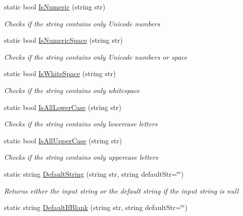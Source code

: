 \begin{DoxyCompactItemize}
static bool \hyperlink{class_ultimate_1_1_utilities_1_1_string_utils_a55f3fbe745289f5b8c9884d0052b39dd}{Is\+Numeric} (string str)
\begin{DoxyCompactList}\small\item\em Checks if the string contains only Unicode numbers \end{DoxyCompactList}\item 
static bool \hyperlink{class_ultimate_1_1_utilities_1_1_string_utils_a1497cb8c5af666caea9f752738a7f25e}{Is\+Numeric\+Space} (string str)
\begin{DoxyCompactList}\small\item\em Checks if the string contains only Unicode numbers or space \end{DoxyCompactList}\item 
static bool \hyperlink{class_ultimate_1_1_utilities_1_1_string_utils_a63ce4357e218e2e67c8d7c836d1c12a4}{Is\+White\+Space} (string str)
\begin{DoxyCompactList}\small\item\em Checks if the string contains only whitespace \end{DoxyCompactList}\item 
static bool \hyperlink{class_ultimate_1_1_utilities_1_1_string_utils_a8e37858887d92ee09ba92633c5878a85}{Is\+All\+Lower\+Case} (string str)
\begin{DoxyCompactList}\small\item\em Checks if the string contains only lowercase letters \end{DoxyCompactList}\item 
static bool \hyperlink{class_ultimate_1_1_utilities_1_1_string_utils_aaa5b2f4944fb2b963129e0e7489006b2}{Is\+All\+Upper\+Case} (string str)
\begin{DoxyCompactList}\small\item\em Checks if the string contains only uppercase letters \end{DoxyCompactList}\item 
static string \hyperlink{class_ultimate_1_1_utilities_1_1_string_utils_abecd1fcd7aff3cef91cfd60cc57e86e3}{Default\+String} (string str, string default\+Str=\char`\"{}\char`\"{})
\begin{DoxyCompactList}\small\item\em Returns either the input string or the default string if the input string is null \end{DoxyCompactList}\item 
static string \hyperlink{class_ultimate_1_1_utilities_1_1_string_utils_a320f31572dfa7dc965ffe531fec943c7}{Default\+If\+Blank} (string str, string default\+Str=\char`\"{}\char`\"{})

\end{DoxyCompactItemize}
